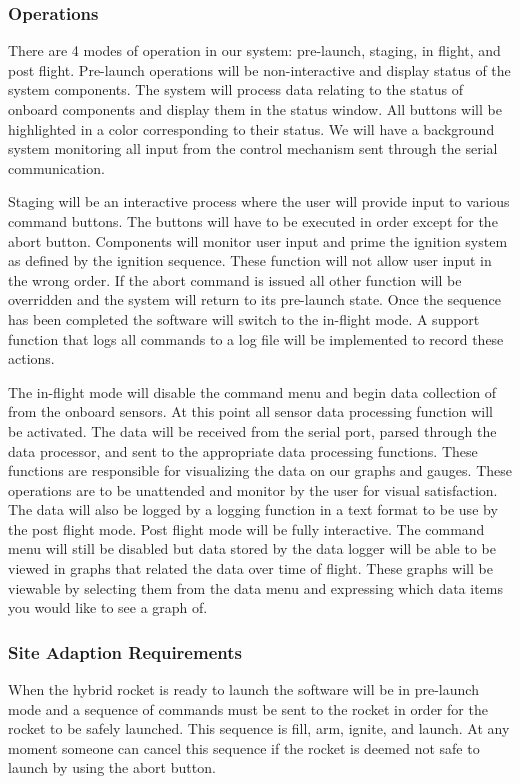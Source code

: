 \documentclass[10pt,draftclsnofoot,onecolumn]{IEEEtran}
\begin{document}
\subsubsection {Operations}
There are 4 modes of operation in our system: pre-launch, staging, in flight, and post flight.  Pre-launch operations will be non-interactive and display status of the system components. The system will process data relating to the status of onboard components and display them in the status window. All buttons will be highlighted in a color corresponding to their status. We will have a background system monitoring all input from the control mechanism sent through the serial communication. \par
	Staging will be an interactive process where the user will provide input to various command buttons. The buttons will have to be executed in order except for the abort button. Components will monitor user input and prime the ignition system as defined by the ignition sequence. These function will not allow user input in the wrong order. If the abort command is issued all other function will be overridden and the system will return to its pre-launch state. Once the sequence has been completed the software will switch to the in-flight mode. A support function that logs all commands to a log file will be implemented to record these actions.\par
	The in-flight mode will disable the command menu and begin data collection of from the onboard sensors. At this point all sensor data processing function will be activated. The data will be received from the serial port, parsed through the data processor, and sent to the appropriate data processing functions. These functions are responsible for visualizing the data on our graphs and gauges. These operations are to be unattended and monitor by the user for visual satisfaction.  The data will also be logged by a logging function in a text format to be use by the post flight mode.
	Post flight mode will be fully interactive. The command menu will still be disabled but data stored by the data logger will be able to be viewed in graphs that related the data over time of flight. These graphs will be viewable by selecting them from the data menu and expressing which data items you would like to see a graph of. \par

\subsubsection{Site Adaption Requirements}
When the hybrid rocket is ready to launch the software will be in pre-launch mode and a sequence of commands must be sent to the rocket in order for the rocket to be safely launched. This sequence is fill, arm, ignite, and launch. At any moment someone can cancel this sequence if the rocket is deemed not safe to launch by using the abort button.
\end{document}
